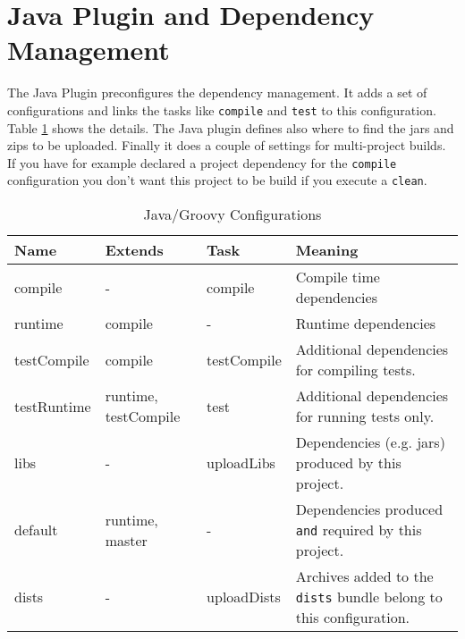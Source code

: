 \section{Java Plugin and Dependency Management} %
\label{sec:java_plugin_and_dependency_management}
The Java Plugin preconfigures the dependency management. It adds a set of configurations and links the tasks like \texttt{compile} and \texttt{test} to this configuration. Table \ref{tab:configurations} shows the details. The Java plugin defines also where to find the jars and zips to be uploaded. Finally it does a couple of settings for multi-project builds. If you have for example declared a project dependency for the \texttt{compile} configuration you don't want this project to be build if you execute a \texttt{clean}. 
 
\begin{table}	
	\begin{tabularx}{\textwidth}{|l|l|l|X|} \hline
	\textbf{Name} & \textbf{Extends} & \textbf{Task} & \textbf{Meaning} \\ \hline
	compile & - & compile & Compile time dependencies\\ \hline
	runtime & compile & - & Runtime dependencies \\ \hline
	testCompile & compile & testCompile & Additional dependencies for compiling tests. \\ \hline
	testRuntime & runtime, testCompile & test & Additional dependencies for running tests only. \\ \hline
	libs & - & uploadLibs & Dependencies (e.g. jars) produced by this project.\\ \hline
	default & runtime, master & - & Dependencies produced \texttt{and} required by this project.\\  \hline
	dists & - & uploadDists & Archives added to the \texttt{dists} bundle belong to this configuration.\\ \hline
	\end{tabularx}
	\caption{Java/Groovy Configurations}
	\label{tab:configurations}
\end{table}	

